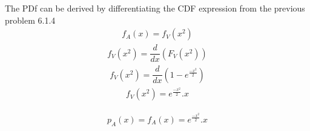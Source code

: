 \documentclass[journal,12pt,twocolumn]{IEEEtran}
\begin{document}
The PDf can be derived by differentiating the CDF expression from the previous problem 6.1.4 \\
\begin{align}f_A(x) = f_V(x^2)\end{align}
\begin{align}f_V(x^2) = \dfrac{d}{dx}(F_V(x^2))\end{align}
\begin{align}f_V(x^2) = \dfrac{d}{dx}(1 - e^\frac{-x^2}{2})\end{align}
\begin{align}f_V(x^2) = e^\frac{-x^2}{2}.x\end{align}
\begin{mdframed}
\begin{align*}p_A(x) = f_A(x) = e^\frac{-x^2}{2}.x\end{align*}
\end{mdframed}
\end{document}
